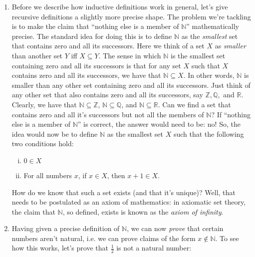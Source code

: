 \begin{enumerate}[{\thesection}.1]
	\item Before we describe how inductive definitions work in general, let's give recursive definitions a slightly more precise shape. The problem we're tackling is to make the claim that ``nothing else is a member of $\mathbb{N}$'' mathematically precise. The standard idea for doing this is to define $\mathbb{N}$ as the \emph{smallest} set that contains zero and all its successors.  Here we think of a set $X$ as \emph{smaller} than another set $Y$ iff $X\subseteq Y$. The sense in which $\mathbb{N}$ is the smallest set containing zero and all its successors is that for any set $X$ such that $X$ contains zero and all its successors, we have that $\mathbb{N}\subseteq X$. In other words, $\mathbb{N}$ is smaller than any other set containing zero and all its successors.  Just think of any other set that also contains zero and all its successors, say $\mathbb{Z}, \mathbb{Q},$ and $\mathbb{R}$. Clearly, we have that $\mathbb{N}\subseteq \mathbb{Z}$, $\mathbb{N}\subseteq \mathbb{Q}$, and $\mathbb{N}\subseteq \mathbb{R}$. Can we find a set that contains zero and all it's successors but not all the members of $\mathbb{N}$? If ``nothing else is a member of $\mathbb{N}$'' is correct, the answer would need to be: no! So, the idea would now be to define $\mathbb{N}$ as the smallest set $X$ such that the following two conditions hold: 
	\begin{enumerate}[(i)]
	
		\item $0\in X$
		
		\item For all numbers $x$, if $x\in X$, then $x+1\in X$.
	
	\end{enumerate}
How do we know that such a set exists (and that it's unique)? Well, that needs to be postulated as an axiom of mathematics: in axiomatic set theory, the claim that $\mathbb{N}$, so defined, exists is known as the \emph{axiom of infinity}.

	\item Having given a precise definition of $\mathbb{N}$, we can now \emph{prove} that certain numbers aren't natural, i.e. we can prove claims of the form $x\notin\mathbb{N}$. To see how this works, let's prove that $\frac{1}{2}$ is not a natural number:
	

\end{enumerate}

